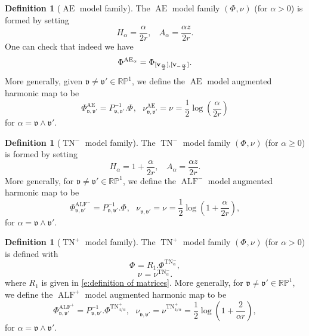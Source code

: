 \documentclass[a4paper,11pt]{amsart}
\theoremstyle{definition}
\newtheorem{definition}[theorem]{Definition}
\numberwithin{equation}{section}
\newcommand{\R}{\mathbb{R}}
\newcommand{\dP}{\mathbb{P}}
\newcommand{\mv} {\mathfrak v}
\newcommand{\bP}{\mathbb P}
\DeclareMathOperator{\bv}{{\bf v}}
\DeclareMathOperator{\Aea}{AE_\alpha}
\DeclareMathOperator{\Ae}{AE}
\DeclareMathOperator{\ALF}{ALF}
\DeclareMathOperator{\TN}{TN}
\DeclareMathOperator{\TNap}{TN^+_\alpha}
\DeclareMathOperator{\TNam}{TN^{--}_\alpha}
\DeclareMathOperator{\ALFp}{ALF^+}
\DeclareMathOperator{\ALFm}{ALF^{--}}
\begin{document}
\begin{definition}[$\Ae$ model family] \label{def:Ae model family}
    The $\Ae$ model family $(\Phi^{\Aea}, \nu^{\Aea})$ (for $\alpha>0$)  is formed by setting
$$H_\alpha=\frac{\alpha}{2r}, \ \ \ \  A_\alpha=\frac{\alpha z}{2r}.$$
One can check that indeed we have $$\Phi^{\Aea}=\Phi_{[\bv_{\frac{\alpha}{2}}], [\bv_{-\frac{\alpha}{2}}]}.$$
More generally, 
given  $\mv\neq \mv'\in \R\bP^1$, we define the $\Ae$ model augmented harmonic map to be 
\begin{equation}\label{e:definition of Phi Ae general}\Phi_{\mv, \mv'}^{\Ae}=P_{\mv, \mv'}^{-1}.\Phi^{\Aea}, \ \ \ \nu_{\mv, \mv'}^{\Ae}=\nu^{\Aea}=\frac{1}{2}\log(\frac{\alpha}{2r})
\end{equation}
for $\alpha=\mv\wedge\mv'$.
\end{definition}
\begin{definition}[$\TN^-$ model family]\label{def:TNplus family}
    The $\TN^{-}$ model family $(\Phi^{\TNam},  \nu^{\TNam})$ (for $\alpha\geq 0$) is formed by setting
\begin{equation}\label{e:defintion of Halpha and Aalpha}H_\alpha=1+\frac{\alpha}{2r}, \ \ \ \  A_\alpha=\frac{\alpha z}{2r}.\end{equation}
More generally, for $\mv\neq\mv'\in \R\dP^1$, 
 we define the $\ALF^-$ model augmented harmonic map to be
\begin{equation}\label{e:definition of Phi TN general}\Phi_{\mv, \mv'}^{\ALF^-}=P_{\mv, \mv'}^{-1}.\Phi^{\TNam}, \ \ \ \nu_{\mv, \mv'}^{\ALFm}=\nu^{\TNam}=\frac{1}{2}\log(1+\frac{\alpha}{2r}),
\end{equation}
for $\alpha=\mv\wedge\mv'$.
\end{definition}


\begin{definition}[$\TN^+$ model family]
The $\TN^{+}$ model family $(\Phi^{\TNap},  \nu^{\TNap})$ (for $\alpha>0$) is defined with 
    $$\Phi^{\TNap}=R_1.\Phi^{\TN^{-}_{\alpha}},$$
    $$\nu^{\TNap}=\nu^{\TN^-_{\alpha}}.$$
where $R_1$ is given in \eqref{e:definition of matrices}.
More generally, for $\mv\neq\mv'\in \R\dP^1$, 
 we define the $\ALF^+$ model augmented harmonic map to be
\begin{equation}\label{e:definition of Phi TN+ general}\Phi_{\mv, \mv'}^{\ALF^+}=P_{\mv, \mv'}^{-1}.\Phi^{\TN^+_{4/\alpha}},\ \ \ \nu_{\mv, \mv'}^{\ALFp}=\nu^{\TN_{4/\alpha}^+}=\frac{1}{2}\log(1+\frac{2}{\alpha r}), 
\end{equation}
for $\alpha=\mv\wedge\mv'$.
\end{definition}
\end{document}
